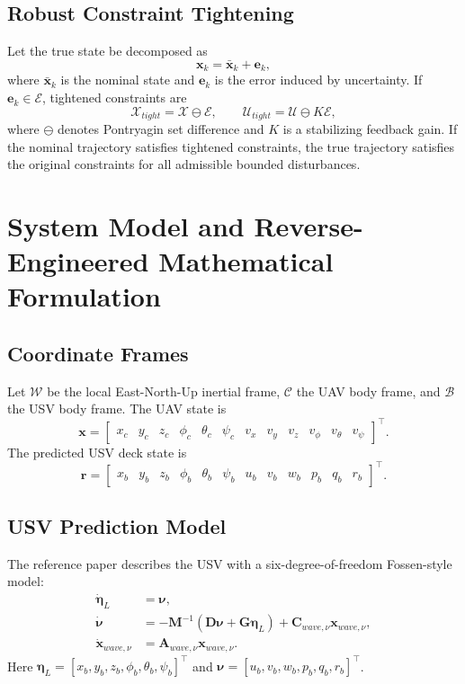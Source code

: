 \documentclass[12pt,a4paper]{report}
\begin{document}
\section{Robust Constraint Tightening}
Let the true state be decomposed as
\begin{equation}
\bm{x}_k=\bar{\bm{x}}_k+\bm{e}_k,
\end{equation}
where $\bar{\bm{x}}_k$ is the nominal state and $\bm{e}_k$ is the error induced by uncertainty. If $\bm{e}_k\in\mathcal{E}$, tightened constraints are
\begin{equation}
\mathcal{X}_{tight}=\mathcal{X}\ominus\mathcal{E},
\qquad
\mathcal{U}_{tight}=\mathcal{U}\ominus K\mathcal{E},
\end{equation}
where $\ominus$ denotes Pontryagin set difference and $K$ is a stabilizing feedback gain. If the nominal trajectory satisfies tightened constraints, the true trajectory satisfies the original constraints for all admissible bounded disturbances.

\chapter{System Model and Reverse-Engineered Mathematical Formulation}

\section{Coordinate Frames}
Let $\mathcal{W}$ be the local East-North-Up inertial frame, $\mathcal{C}$ the UAV body frame, and $\mathcal{B}$ the USV body frame. The UAV state is
\begin{equation}
\bm{x} =
\begin{bmatrix}
x_c & y_c & z_c & \phi_c & \theta_c & \psi_c &
v_x & v_y & v_z & v_\phi & v_\theta & v_\psi
\end{bmatrix}^{\top}.
\end{equation}
The predicted USV deck state is
\begin{equation}
\bm{r} =
\begin{bmatrix}
x_b & y_b & z_b & \phi_b & \theta_b & \psi_b &
u_b & v_b & w_b & p_b & q_b & r_b
\end{bmatrix}^{\top}.
\end{equation}

\section{USV Prediction Model}
The reference paper describes the USV with a six-degree-of-freedom Fossen-style model:
\begin{align}
\dot{\bm{\eta}}_L &= \bm{\nu},\\
\dot{\bm{\nu}} &= -\bm{M}^{-1}(\bm{D}\bm{\nu}+\bm{G}\bm{\eta}_L)
+\bm{C}_{wave,\nu}\bm{x}_{wave,\nu},\\
\dot{\bm{x}}_{wave,\nu} &= \bm{A}_{wave,\nu}\bm{x}_{wave,\nu}.
\end{align}
Here $\bm{\eta}_L=[x_b,y_b,z_b,\phi_b,\theta_b,\psi_b]^{\top}$ and $\bm{\nu}=[u_b,v_b,w_b,p_b,q_b,r_b]^{\top}$.
\end{document}
